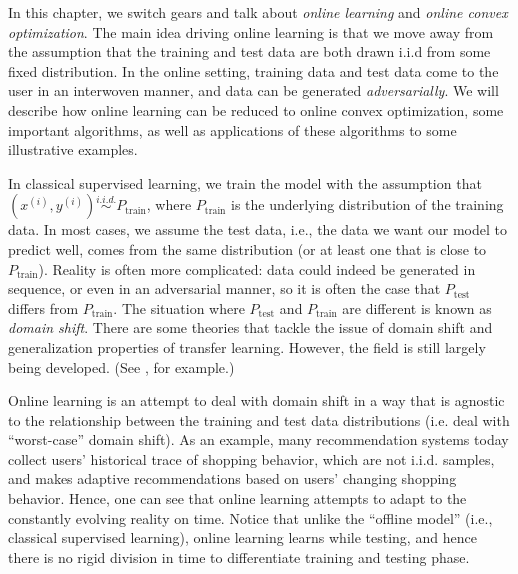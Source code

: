 \setcounter{section}{0}


In this chapter, we switch gears and talk about \textit{online learning} and \textit{online convex optimization}. The main idea driving online learning is that we move away from the assumption that the training and test data are both drawn i.i.d from some fixed distribution. In the online setting, training data and test data come to the user in an interwoven manner, and data can be generated \textit{adversarially}. We will describe how online learning can be reduced to online convex optimization, some important algorithms, as well as applications of these algorithms to some illustrative examples.


In classical supervised learning, we train the model with the assumption that $(x^{(i)}, y^{(i)}) \overset{i.i.d.}{\sim} P_{\text{train}}$, where $P_{\text{train}}$ is the underlying distribution of the training data. In most cases, we assume the test data, i.e., the data we want our model to predict well, comes from the same distribution (or at least one that is close to $P_{\text{train}}$). Reality is often more complicated: data could indeed be generated in sequence, or even in an adversarial manner, so it is often the case that $P_\text{test}$ differs from $P_\text{train}$. The situation where $P_\text{test}$ and $P_{\text{train}}$ are different is known as \textit{domain shift}. There are some theories that tackle the issue of domain shift and generalization properties of transfer learning. However, the field is still largely being developed. (See \cite{ben2007analysis}, for example.)

Online learning is an attempt to deal with domain shift in a way that is agnostic to the relationship between the training and test data distributions (i.e. deal with ``worst-case'' domain shift). As an example, many recommendation systems today collect users' historical trace of shopping behavior, which are not i.i.d. samples, and makes adaptive recommendations based on users' changing shopping behavior. Hence, one can see that online learning attempts to adapt to the constantly evolving reality on time. Notice that unlike the ``offline model'' (i.e., classical supervised learning), online learning learns while testing, and hence there is no rigid division in time to differentiate training and testing phase.

